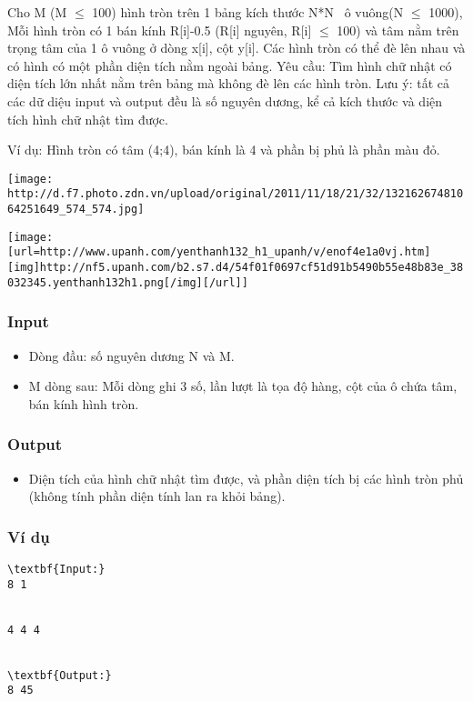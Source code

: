 



   Cho M (M $\le$  100) hình tròn trên 1 bảng kích thước N*N  ô vuông(N  $\le$  1000), Mỗi hình tròn có 1 bán kính R[i]-0.5 (R[i] nguyên, R[i]  $\le$  100) và tâm nằm trên  trọng tâm của 1 ô vuông ở dòng x[i], cột y[i]. Các hình tròn có thể đè lên nhau và có hình có một phần diện tích nằm ngoài bảng. Yêu cầu: Tìm hình chữ nhật có diện tích lớn nhất nằm trên bảng mà không đè lên các hình tròn. Lưu ý: tất cả các dữ diệu input và output đều là số nguyên dương, kể cả kích thước và diện tích hình chữ nhật tìm được.  

   Ví dụ: Hình tròn có tâm (4;4), bán kính là 4 và phần bị phủ là phần màu đỏ.  


\texttt{[image: http://d.f7.photo.zdn.vn/upload/original/2011/11/18/21/32/13216267481064251649\_574\_574.jpg]}


\texttt{[image: [url=http://www.upanh.com/yenthanh132\_h1\_upanh/v/enof4e1a0vj.htm][img]http://nf5.upanh.com/b2.s7.d4/54f01f0697cf51d91b5490b55e48b83e\_38032345.yenthanh132h1.png[/img][/url]]}



\subsubsection{   Input  }
\begin{itemize}
	\item     Dòng đầu: số nguyên dương N và M.   
\end{itemize}
\begin{itemize}
	\item     M dòng sau: Mỗi dòng ghi 3 số, lần lượt là tọa độ hàng, cột của ô chứa tâm, bán kính hình tròn.   
\end{itemize}

\subsubsection{   Output  }
\begin{itemize}
	\item 

       Diện tích của hình chữ nhật tìm được, và phần diện tích bị các hình tròn phủ (không tính phần diện tính lan ra khỏi bảng).      



\end{itemize}

\subsubsection{   Ví dụ  }
\begin{verbatim}
\textbf{Input:}
8 1


4 4 4


\textbf{Output:}
8 45\end{verbatim}
